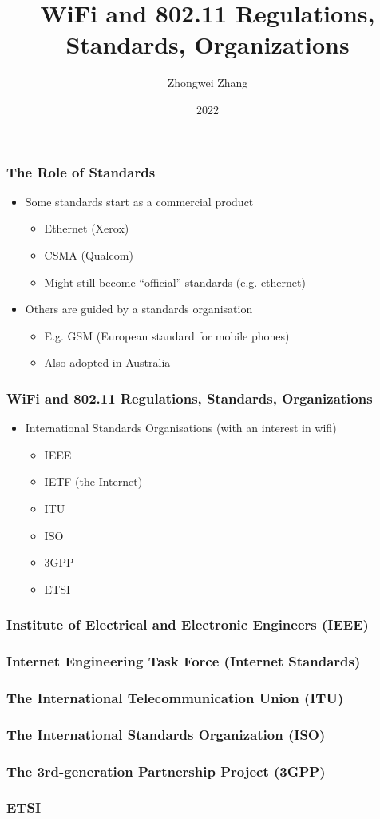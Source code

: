\documentclass[18pt]{beamer}
\title{WiFi and 802.11 Regulations, Standards, Organizations}
\author{Zhongwei Zhang}
\institute{University of Southern Queensland}
\date{2022}
\begin{document}
\frame{\titlepage}
 
\begin{frame}\LARGE
\frametitle{The Role of Standards}
\begin{itemize}\Large
\item Some standards start as a commercial product
\begin{itemize}\large
\item Ethernet (Xerox)
\item CSMA (Qualcom)
\item Might still become ``official'' standards (e.g. ethernet)
\end{itemize}
\item Others are guided by a standards organisation
\begin{itemize}\large
\item E.g. GSM (European standard for mobile phones)
\item Also adopted in Australia
\end{itemize}
\end{itemize}
\end{frame}

\begin{frame}\LARGE
\frametitle{WiFi and 802.11 Regulations, Standards, Organizations}
\begin{itemize}\Large
\item International Standards Organisations (with an interest in wifi)
\begin{itemize}\large
\item IEEE
\item IETF (the Internet)
\item ITU
\item ISO
\item 3GPP
\item ETSI
\end{itemize}
\end{itemize}
\end{frame}

\begin{frame}\LARGE
\frametitle{Institute of Electrical and Electronic Engineers (IEEE)}
\end{frame}

\begin{frame}\LARGE
\frametitle{Internet Engineering Task Force (Internet Standards)}
\end{frame}

\begin{frame}\LARGE
\frametitle{The International Telecommunication Union (ITU)}
\end{frame}

\begin{frame}\LARGE
\frametitle{The International Standards Organization (ISO)}
\end{frame}

\begin{frame}\LARGE
\frametitle{The 3rd-generation Partnership Project (3GPP)}
\end{frame}

\begin{frame}\LARGE
\frametitle{ETSI}
\end{frame}
\end{document}

